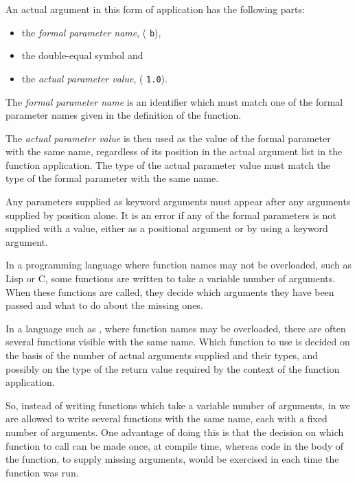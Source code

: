 An actual argument in this form of application has the following parts:
\begin{itemize}
\item the {\em formal parameter name}, (\eg{} {\tt b}),
\item the double-equal symbol \ttin{==} and
\item the {\em actual parameter value}, (\eg{} {\tt 1.0}).
\end{itemize}

The {\em formal parameter name} is an identifier which must match
one of the formal parameter names given in the definition of the function.

The {\em actual parameter value} is then used as the value of the formal
parameter with the same name, regardless of its position in the actual
argument list in the function application.  The type of the actual parameter
value must match the type of the formal parameter with the same name.

Any parameters supplied as keyword arguments must appear after any arguments
supplied by position alone.  It is an error if any of the formal parameters
is not supplied with a value, either as a positional argument or by using
a keyword argument.


In a programming language where function names may not be overloaded,
such as Lisp or C, some functions are written to take a variable number
of arguments.  When these functions are called, they decide which arguments
they have been passed and what to do about the missing ones.

In a language such as \asharp{}, where function names may be overloaded,
there are often several functions visible with the same name.
Which function to use is decided on the basis of the number of actual arguments
supplied and their types, and possibly on the type of the return value
required by the context of the function application.

So, instead of writing functions which take a variable number of
arguments, in \asharp{} we are allowed to write several functions with
the same name, each with a fixed number of arguments.  One advantage
of doing this is that the decision on which function to call can be made
once, at compile time, whereas code in the body of the function, to
supply missing arguments, would be exercised in each time the function
was run.

